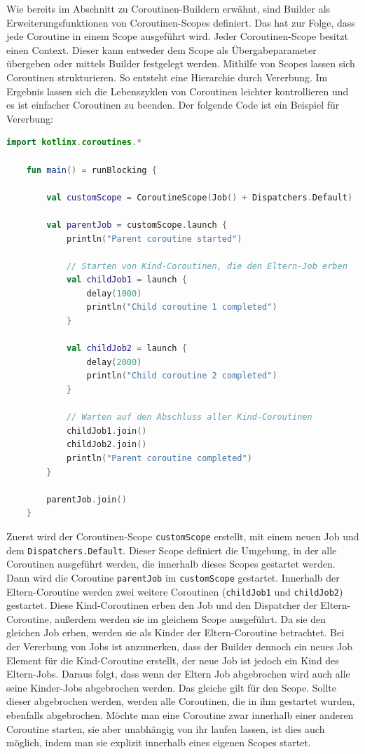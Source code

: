 \documentclass[fontsize=12pt,paper=a4,twoside=semi,parskip=half-,headsepline,headinclude]{scrreprt}
\begin{document}
Wie bereits im Abschnitt zu Coroutinen-Buildern erwähnt, sind Builder als  Erweiterungsfunktionen von Coroutinen-Scopes definiert. Das hat zur Folge, dass jede Coroutine in einem Scope ausgeführt wird. Jeder Coroutinen-Scope besitzt einen Context. Dieser kann entweder dem Scope als Übergabeparameter übergeben oder mittels Builder festgelegt werden. Mithilfe von Scopes lassen sich Coroutinen strukturieren. So entsteht eine Hierarchie durch Vererbung. Im Ergebnis lassen sich die Lebenszyklen von Coroutinen leichter kontrollieren und es ist einfacher Coroutinen zu beenden. Der folgende Code ist ein Beispiel für Vererbung:

\begin{lstlisting}[language=Kotlin]
	import kotlinx.coroutines.*

	fun main() = runBlocking {
	
    	val customScope = CoroutineScope(Job() + Dispatchers.Default)

		val parentJob = customScope.launch {
			println("Parent coroutine started")
			
			// Starten von Kind-Coroutinen, die den Eltern-Job erben
			val childJob1 = launch {
				delay(1000)
				println("Child coroutine 1 completed")
			}
		
			val childJob2 = launch {
				delay(2000)
				println("Child coroutine 2 completed")
			}
		
			// Warten auf den Abschluss aller Kind-Coroutinen
			childJob1.join()
			childJob2.join()
			println("Parent coroutine completed")
		}
	
		parentJob.join()
	}
\end{lstlisting}

Zuerst wird der Coroutinen-Scope \texttt{customScope} erstellt, mit einem neuen Job und dem \texttt{Dispatchers.Default}. Dieser Scope definiert die Umgebung, in der alle Coroutinen ausgeführt werden, die innerhalb dieses Scopes gestartet werden. Dann wird die Coroutine \texttt{parentJob} im \texttt{customScope} gestartet. Innerhalb der Eltern-Coroutine werden zwei weitere Coroutinen (\texttt{childJob1} und \texttt{childJob2}) gestartet. Diese Kind-Coroutinen erben den Job und den Dispatcher der Eltern-Coroutine, außerdem werden sie im gleichem Scope ausgeführt. Da sie den gleichen Job erben, werden sie als Kinder der Eltern-Coroutine betrachtet. Bei der Vererbung von Jobs ist anzumerken, dass der Builder dennoch ein neues Job Element für die Kind-Coroutine erstellt, der neue Job ist jedoch ein Kind des Eltern-Jobs. Daraus folgt, dass wenn der Eltern Job abgebrochen wird auch alle seine Kinder-Jobs abgebrochen werden. Das gleiche gilt für den Scope. Sollte dieser abgebrochen werden, werden alle Coroutinen, die in ihm gestartet wurden, ebenfalls abgebrochen. Möchte man eine Coroutine zwar innerhalb einer anderen Coroutine starten, sie aber unabhängig von ihr laufen lassen, ist dies auch möglich, indem man sie explizit innerhalb eines eigenen Scopes startet.
\end{document}
